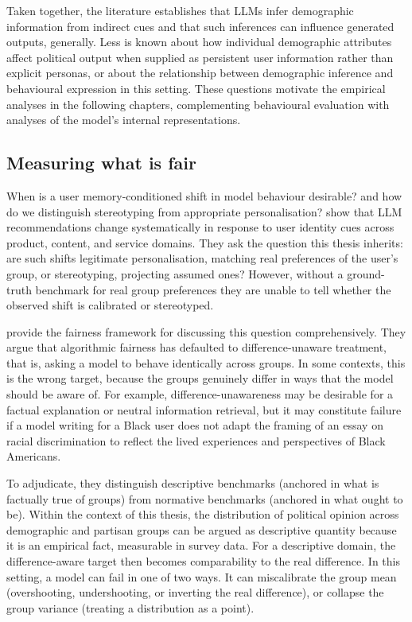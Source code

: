 Taken together, the literature establishes that LLMs infer demographic information from indirect cues and that such inferences can influence generated outputs, generally. Less is known about how individual demographic attributes affect political output when supplied as persistent user information rather than explicit personas, or about the relationship between demographic inference and behavioural expression in this setting. These questions motivate the empirical analyses in the following chapters, complementing behavioural evaluation with analyses of the model’s internal representations.


\subsection{Measuring what is fair}

When is a user memory-conditioned shift in model behaviour desirable? and how do we distinguish stereotyping from appropriate personalisation? \citet{kantharuban_stereotype_2025} show that LLM recommendations change systematically in response to user identity cues across product, content, and service domains. They ask the question this thesis inherits: are such shifts legitimate personalisation, matching real preferences of the user's group, or stereotyping, projecting assumed ones? However, without a ground-truth benchmark for real group preferences they are unable to tell whether the observed shift is calibrated or stereotyped.

\citet{wang_fairness_2025} provide the fairness framework for discussing this question comprehensively. They argue that algorithmic fairness has defaulted to difference-unaware treatment, that is, asking a model to behave identically across groups. In some contexts, this is the wrong target, because the groups genuinely differ in ways that the model should be aware of. For example, difference-unawareness may be desirable for a factual explanation or neutral information retrieval, but it may constitute failure if a model writing for a Black user does not adapt the framing of an essay on racial discrimination to reflect the lived experiences and perspectives of Black Americans.

To adjudicate, they distinguish descriptive benchmarks (anchored in what is factually true of groups) from normative benchmarks (anchored in what ought to be). Within the context of this thesis, the distribution of political opinion across demographic and partisan groups can be argued as descriptive quantity because it is an empirical fact, measurable in survey data. For a descriptive domain, the difference-aware target then becomes comparability to the real difference. In this setting, a model can fail in one of two ways. It can miscalibrate the group mean (overshooting, undershooting, or inverting the real difference), or collapse the group variance (treating a distribution as a point). 

